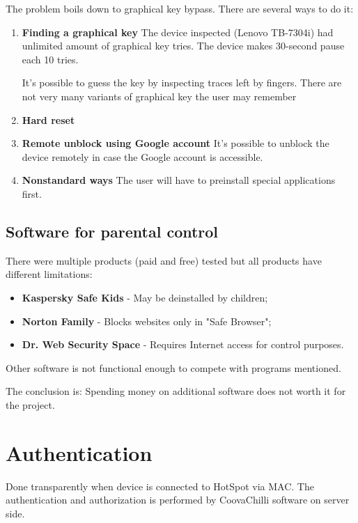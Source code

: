 The problem boils down to graphical key bypass. There are
several ways to do it:

\begin{enumerate}
\item \textbf{Finding a graphical key}
The device inspected (Lenovo TB-7304i) had unlimited amount of
graphical key tries. The device makes 30-second pause each 10 tries.

It's possible to guess the key by inspecting traces left by fingers.
There are not very many variants of graphical key the user may remember
\item \textbf{Hard reset}
\item \textbf{Remote unblock using Google account}
It's possible to unblock the device remotely in case the Google account
is accessible.
\item \textbf{Nonstandard ways}
The user will have to preinstall special applications first.
\end{enumerate}


\subsection{Software for parental control}

There were multiple products (paid and free) tested but all products
have different limitations:

\begin{itemize}
\item \textbf{Kaspersky Safe Kids} - May be deinstalled by children;
\item \textbf{Norton Family} - Blocks websites only in "Safe Browser";
\item \textbf{Dr. Web Security Space} - Requires Internet access for
control purposes.
\end{itemize}

Other software is not functional enough to compete with programs
mentioned.

The conclusion is: Spending money on additional software does not
worth it for the project.


\section{Authentication}

Done transparently when device is connected to HotSpot via MAC. The
authentication and authorization is performed by CoovaChilli software
on server side.


